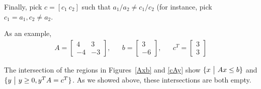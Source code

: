 \documentclass[10pt]{article}
\begin{document}
\begin{solution}
Finally, pick \( c = [c_1~ c_2] \) such that \( a_1/a_2 \neq c_1/c_2 \) (for instance, pick \( c_1 = a_1, c_2\neq a_2 \).

As an example, 
\begin{align*}
    A = \left[\begin{array}{rr}4&3\\-4&-3\end{array}\right], 
        && b= \left[\begin{array}{r}3\\-6\end{array}\right],
        && c^T = \left[\begin{array}{r}3\\3\end{array}\right]
\end{align*}

The intersection of the regions in Figures~\ref{Axb} and \ref{cAy} show \( \{x~\big|~ Ax\leq b\} \) and \( \{y~\big|~ y\geq 0, y^TA=c^T \} \). As we showed above, these intersections are both empty.


\end{solution}
\end{document}
